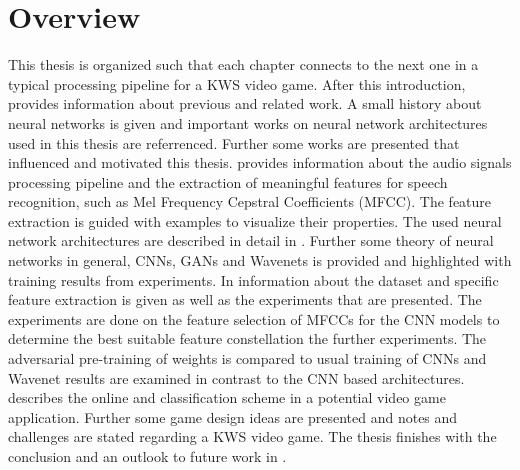
\section{Overview}\label{sec:intro_overview}
\thesisStateRevised
This thesis is organized such that each chapter connects to the next one in a typical processing pipeline for a KWS video game.
After this introduction,  provides information about previous and related work.
A small history about neural networks is given and important works on neural network architectures used in this thesis are referrenced.
Further some works are presented that influenced and motivated this thesis.
 provides information about the audio signals processing pipeline and the extraction of meaningful features for speech recognition, such as Mel Frequency Cepstral Coefficients (MFCC).
The feature extraction is guided with examples to visualize their properties.
The used neural network architectures are described in detail in . 
Further some theory of neural networks in general, CNNs, GANs and Wavenets is provided and highlighted with training results from experiments.
In  information about the dataset and specific feature extraction is given as well as the experiments that are presented.
The experiments are done on the feature selection of MFCCs for the CNN models to determine the best suitable feature constellation the further experiments.
The adversarial pre-training of weights is compared to usual training of CNNs and Wavenet results are examined in contrast to the CNN based architectures.
 describes the online and classification scheme in a potential video game application.
Further some game design ideas are presented and notes and challenges are stated regarding a KWS video game.
The thesis finishes with the conclusion and an outlook to future work in .

